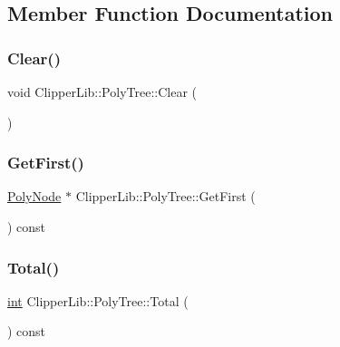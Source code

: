 \subsection{Member Function Documentation}
\mbox{\label{class_clipper_lib_1_1_poly_tree_a8620ea631d478b3c43274ac084902ec4}} 
\subsubsection{\texorpdfstring{Clear()}{Clear()}}
{\footnotesize\ttfamily void Clipper\+Lib\+::\+Poly\+Tree\+::\+Clear (\begin{DoxyParamCaption}{ }\end{DoxyParamCaption})}

\mbox{\label{class_clipper_lib_1_1_poly_tree_a8b88b8d6225281ee7d536902b0d04e9e}} 
\subsubsection{\texorpdfstring{GetFirst()}{GetFirst()}}
{\footnotesize\ttfamily \mbox{\hyperlink{class_clipper_lib_1_1_poly_node}{Poly\+Node}} $\ast$ Clipper\+Lib\+::\+Poly\+Tree\+::\+Get\+First (\begin{DoxyParamCaption}{ }\end{DoxyParamCaption}) const}

\mbox{\label{class_clipper_lib_1_1_poly_tree_ad0d3c974bab5a30cc8c916da9fe14388}} 
\subsubsection{\texorpdfstring{Total()}{Total()}}
{\footnotesize\ttfamily \mbox{\hyperlink{draw_8hh_aa620a13339ac3a1177c86edc549fda9b}{int}} Clipper\+Lib\+::\+Poly\+Tree\+::\+Total (\begin{DoxyParamCaption}{ }\end{DoxyParamCaption}) const}



